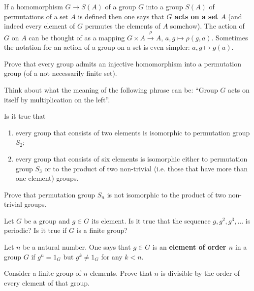 \documentclass[12pt]{article}
\begin{document}
\begin{opredelenie}
  If a homomorphism $G \to S(A)$ of a group $G$ into a group $S(A)$ of
  permutations of a set $A$ is defined then one says that {\bf $G$
    acts on a set $A$} (and indeed every element of $G$ permutes the
  elements of $A$ somehow). The action of $G$ on $A$ can be thought of
  as a mapping $G \times A \overset{\rho}{\to} A$, $a, g \mapsto
  \rho(g, a)$. Sometimes the notation for an action of a group on a set
  is even simpler: $a, g \mapsto g(a)$.
\end{opredelenie}

\begin{zadacha} Prove that every group admits an injective
  homomorphism into a permutation group (of a not necessarily finite
  set).
\end{zadacha}

\begin{ukazanie} Think about what the meaning of the following phrase
  can be: ``Group $G$ acts on itself by multiplication on the left''.
\end{ukazanie}

\begin{zadacha} Is it true that
\begin{enumerate}
\item every group that consists of two elements is isomorphic to 
  permutation group $S_2$;
\item every group that consists of six elements is isomorphic either
  to permutation group $S_3$ or to the product of two non-trivial
  (i.e. those that have more than one element) groups.
\end{enumerate}
\end{zadacha}

\begin{zadacha}[*] Prove that permutation group $S_n$ is not
  isomorphic to the product of two non-trivial groups.
\end{zadacha}

\begin{zadacha}
Let $G$ be a group and $g \in G$ its element. Is it true that the
sequence $g,g^2,g^3,\dots$ is periodic? Is it true if  $G$ is a finite
group?
\end{zadacha}

Let $n$ be a natural number. One says that $g \in G$ is an {\bf
element of order $n$} in a group $G$ if $g^n = 1_G$ but $g^k \neq 1_G$
for any $k < n$.

\begin{zadacha}[!]
Consider a finite group of $n$ elements. Prove that $n$ is divisible
by the order of every element of that group.
\end{zadacha}
\end{document}
